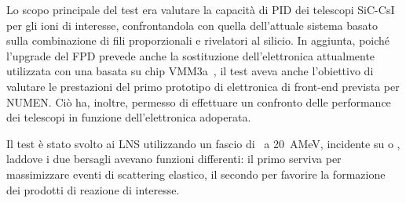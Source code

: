 Lo scopo principale del test era valutare la capacità di PID dei telescopi SiC-CsI per gli ioni di interesse, confrontandola con quella dell'attuale sistema basato sulla combinazione di fili proporzionali e rivelatori al silicio.
In aggiunta, poiché l'upgrade del FPD prevede anche la sostituzione dell'elettronica attualmente utilizzata con una basata su chip VMM3a~\cite{degeronimo:ieee13}, il test aveva anche l'obiettivo di valutare le prestazioni del primo prototipo di elettronica di front-end prevista per NUMEN.
Ciò ha, inoltre, permesso di effettuare un confronto delle performance dei telescopi in funzione dell'elettronica adoperata.

Il test è stato svolto ai LNS utilizzando un fascio di~ a 20~AMeV, incidente su  o , laddove i due bersagli avevano funzioni differenti: il primo serviva per massimizzare eventi di scattering elastico, il secondo per favorire la formazione dei prodotti di reazione di interesse.






\subsection{}

